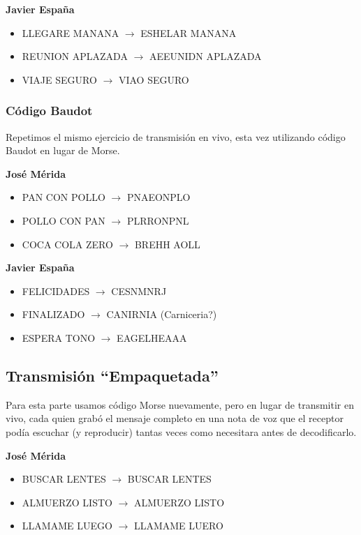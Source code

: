 \documentclass[11pt]{article}
\begin{document}
\textbf{Javier España}
\begin{itemize}[nosep]
  \item LLEGARE MANANA $\rightarrow$ ESHELAR MANANA
  \item REUNION APLAZADA $\rightarrow$ AEEUNIDN APLAZADA
  \item VIAJE SEGURO $\rightarrow$ VIAO SEGURO
\end{itemize}

\subsubsection*{Código Baudot}

Repetimos el mismo ejercicio de transmisión en vivo, esta vez utilizando código Baudot en lugar de Morse.

\textbf{José Mérida}
\begin{itemize}[nosep]
  \item PAN CON POLLO $\rightarrow$ PNAEONPLO
  \item POLLO CON PAN $\rightarrow$ PLRRONPNL
  \item COCA COLA ZERO $\rightarrow$ BREHH AOLL
\end{itemize}

\textbf{Javier España}
\begin{itemize}[nosep]
  \item FELICIDADES $\rightarrow$ CESNMNRJ
  \item FINALIZADO $\rightarrow$ CANIRNIA (Carniceria?)
  \item ESPERA TONO $\rightarrow$ EAGELHEAAA
\end{itemize}

\subsection*{Transmisión ``Empaquetada''}

Para esta parte usamos código Morse nuevamente, pero en lugar de transmitir en vivo, cada quien grabó el mensaje completo en una nota de voz que el receptor podía escuchar (y reproducir) tantas veces como necesitara antes de decodificarlo.

\textbf{José Mérida}
\begin{itemize}[nosep]
  \item BUSCAR LENTES $\rightarrow$ BUSCAR LENTES
  \item ALMUERZO LISTO $\rightarrow$ ALMUERZO LISTO
  \item LLAMAME LUEGO $\rightarrow$ LLAMAME LUERO
\end{itemize}
\end{document}
